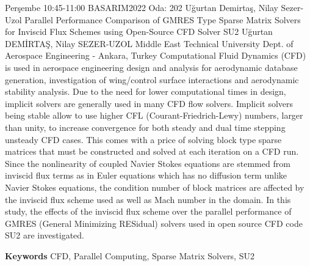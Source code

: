 
    \begin{abstract_basarim}
    {Perşembe 10:45-11:00}
    {BASARIM2022}
    {Oda: 202}
    {Uğurtan Demirtaş, Nilay Sezer-Uzol}
    {Parallel Performance Comparison of GMRES Type Sparse Matrix Solvers for Inviscid Flux Schemes using Open-Source CFD Solver SU2}
    {%
    Uğurtan DEMİRTAŞ, Nilay SEZER-UZOL}
    {%
    }
    {%
    Middle East Technical University Dept. of Aerospace Engineering - Ankara, Turkey}
    Computational Fluid Dynamics (CFD) is used in aerospace engineering design and analysis for aerodynamic database generation, investigation of wing/control surface interactions and aerodynamic stability analysis. Due to the need for lower computational times in design, implicit solvers are generally used in many CFD flow solvers. Implicit solvers being stable allow to use higher CFL (Courant-Friedrich-Lewy) numbers, larger than unity, to increase convergence for both steady and dual time stepping unsteady CFD cases. This comes with a price of solving block type sparse matrices that must be constructed and solved at each iteration on a CFD run. Since the nonlinearity of coupled Navier Stokes equations are stemmed from inviscid flux terms as in Euler equations which has no diffusion term unlike Navier Stokes equations, the condition number of block matrices are affected by the inviscid flux scheme used as well as Mach number in the domain. In this study, the effects of the inviscid flux scheme over the parallel performance of GMRES (General Minimizing RESidual) solvers used in open source CFD code SU2 are investigated. 
    
        \textbf{Keywords} \newline{}CFD, Parallel Computing, Sparse Matrix Solvers, SU2
    \end{abstract_basarim}
    